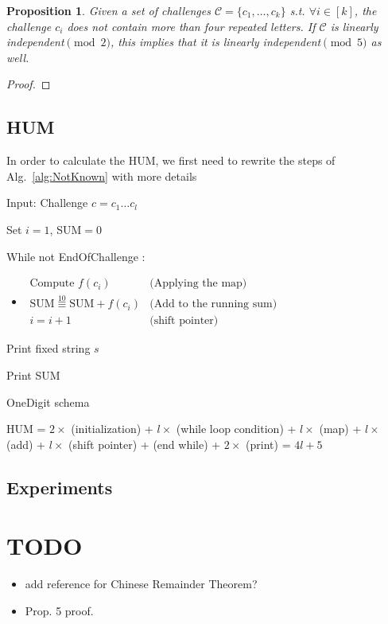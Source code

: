 \documentclass{article}
\newtheorem{proposition}[theorem]{Proposition}
\newenvironment{alg}{
    \begin{list}{}{
        \setlength{\itemsep}{2pt}
        \setlength{\parsep}{0pt}
        \setlength{\parskip}{0pt}
        \setlength{\topsep}{1pt}
    }
}
{
    \end{list}
}
\begin{document}
\begin{proposition}
\label{prop:mod2}
Given a set of challenges $\mathcal{C}=\{c_1,\ldots,c_k\}$ s.t. $\forall i\in[k]$, the challenge $c_i$ does not contain more than four repeated letters. If $\mathcal{C}$ is linearly independent$\pmod{2}$, this implies that it is linearly independent$\pmod{5}$ as well.
\end{proposition}
\begin{proof}
	
\end{proof}
	
	






\subsection{HUM}
In order to calculate the HUM, we first need to rewrite the steps of Alg.~\ref{alg:NotKnown} with more details

\begin{algorithm}
\begin{alg}
\item[] Input: Challenge $c=c_1 \ldots c_l$
\item[] Set $i=1$, SUM$=0$
\item[] While not EndOfChallenge :

\begin{itemize}
	\item[] $\begin{array}{lr}
		\text{Compute } f(c_i) & \text{(Applying the map)} \\
		\text{SUM} \overset{10}{\equiv} \text{SUM} + f(c_i) & \text{(Add to the running sum)} \\
			i=i+1 & \text{(shift pointer)} 
	\end{array}$
\end{itemize}

\item[] Print fixed string $s$
\item[] Print SUM

\label{alg:HUM}
\end{alg}
\caption{OneDigit schema}
\end{algorithm}

HUM =  $2 \times$ (initialization) + $l \times$ (while loop condition) + $l \times$ (map) + $l \times$ (add) + $l \times$ (shift pointer) + (end while) + $2 \times$ (print) = $4l+5$




\subsection{Experiments}

\section{TODO}
\begin{itemize}
\item add reference for Chinese Remainder Theorem?	
\item Prop. 5 proof.
\end{itemize}
\end{document}
